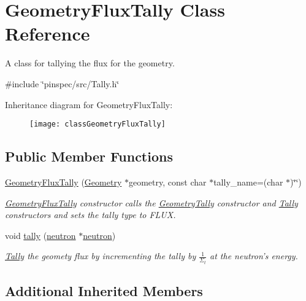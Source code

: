 \hypertarget{classGeometryFluxTally}{\section{Geometry\-Flux\-Tally Class Reference}
\label{classGeometryFluxTally}
}


A class for tallying the flux for the geometry.  




{\ttfamily \#include \char`\"{}pinspec/src/\-Tally.\-h\char`\"{}}

Inheritance diagram for Geometry\-Flux\-Tally\-:\begin{figure}[H]
\begin{center}
\leavevmode
\texttt{[image: classGeometryFluxTally]}
\end{center}
\end{figure}
\subsection*{Public Member Functions}
\begin{DoxyCompactItemize}
\item 
\hyperlink{classGeometryFluxTally_afe633b1d646dfe7bbf3232cb49095356}{Geometry\-Flux\-Tally} (\hyperlink{classGeometry}{Geometry} $\ast$geometry, const char $\ast$tally\-\_\-name=(char $\ast$)\char`\"{}\char`\"{})
\begin{DoxyCompactList}\small\item\em \hyperlink{classGeometryFluxTally}{Geometry\-Flux\-Tally} constructor calls the \hyperlink{classGeometryTally}{Geometry\-Tally} constructor and \hyperlink{classTally}{Tally} constructors and sets the tally type to F\-L\-U\-X. \end{DoxyCompactList}\item 
void \hyperlink{classGeometryFluxTally_a2c7d83a4577cff56a1cecf8a339db547}{tally} (\hyperlink{structneutron}{neutron} $\ast$\hyperlink{structneutron}{neutron})
\begin{DoxyCompactList}\small\item\em \hyperlink{classTally}{Tally} the geomety flux by incrementing the tally by $ \frac{1}{\Sigma_t} $ at the neutron's energy. \end{DoxyCompactList}\end{DoxyCompactItemize}
\subsection*{Additional Inherited Members}


